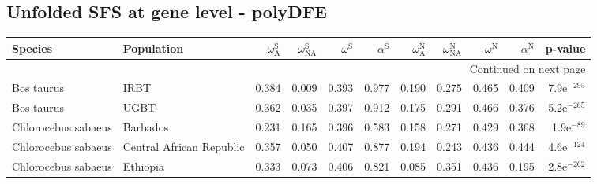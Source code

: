 \subsection{Unfolded SFS at gene level - polyDFE} 
\begin{longtable}{llrrrrrrrrr}
\toprule
             Species &                Population & $\omega_{\textrm{A}}^{\textrm{S}}$ & $\omega_{\textrm{NA}}^{\textrm{S}}$ & $\omega^{\textrm{S}}$ & $\alpha^{\textrm{S}}$ & $\omega_{\textrm{A}}^{\textrm{N}}$ & $\omega_{\textrm{NA}}^{\textrm{N}}$ & $\omega^{\textrm{N}}$ & $\alpha^{\textrm{N}}$ &       p-value \\
\midrule
\endhead
\midrule
\multicolumn{11}{r}{{Continued on next page}} \\
\midrule
\endfoot

\bottomrule
\endlastfoot
          Bos taurus &                      IRBT &                              0.384 &                               0.009 &                 0.393 &                 0.977 &                              0.190 &                               0.275 &                 0.465 &                 0.409 & 7.9e$^{-295}$ \\
          Bos taurus &                      UGBT &                              0.362 &                               0.035 &                 0.397 &                 0.912 &                              0.175 &                               0.291 &                 0.466 &                 0.376 & 5.2e$^{-265}$ \\
 Chlorocebus sabaeus &                  Barbados &                              0.231 &                               0.165 &                 0.396 &                 0.583 &                              0.158 &                               0.271 &                 0.429 &                 0.368 &  1.9e$^{-89}$ \\
 Chlorocebus sabaeus &  Central African Republic &                              0.357 &                               0.050 &                 0.407 &                 0.877 &                              0.194 &                               0.243 &                 0.436 &                 0.444 & 4.6e$^{-124}$ \\
 Chlorocebus sabaeus &                  Ethiopia &                              0.333 &                               0.073 &                 0.406 &                 0.821 &                              0.085 &                               0.351 &                 0.436 &                 0.195 & 2.8e$^{-262}$ \\

\end{longtable}
